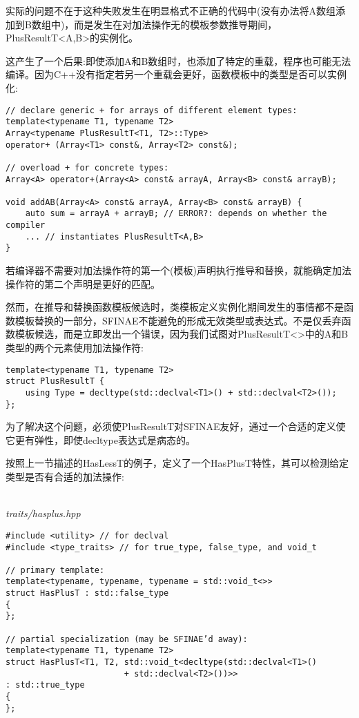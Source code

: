实际的问题不在于这种失败发生在明显格式不正确的代码中(没有办法将A数组添加到B数组中)，而是发生在对加法操作无的模板参数推导期间，PlusResultT<A,B>的实例化。

这产生了一个后果:即使添加A和B数组时，也添加了特定的重载，程序也可能无法编译。因为C++没有指定若另一个重载会更好，函数模板中的类型是否可以实例化:

\begin{lstlisting}[style=styleCXX]
// declare generic + for arrays of different element types:
template<typename T1, typename T2>
Array<typename PlusResultT<T1, T2>::Type>
operator+ (Array<T1> const&, Array<T2> const&);

// overload + for concrete types:
Array<A> operator+(Array<A> const& arrayA, Array<B> const& arrayB);

void addAB(Array<A> const& arrayA, Array<B> const& arrayB) {
	auto sum = arrayA + arrayB; // ERROR?: depends on whether the compiler
	... // instantiates PlusResultT<A,B>
}
\end{lstlisting}

若编译器不需要对加法操作符的第一个(模板)声明执行推导和替换，就能确定加法操作符的第二个声明是更好的匹配。

然而，在推导和替换函数模板候选时，类模板定义实例化期间发生的事情都不是函数模板替换的一部分，SFINAE不能避免的形成无效类型或表达式。不是仅丢弃函数模板候选，而是立即发出一个错误，因为我们试图对PlusResultT<>中的A和B类型的两个元素使用加法操作符:

\begin{lstlisting}[style=styleCXX]
template<typename T1, typename T2>
struct PlusResultT {
	using Type = decltype(std::declval<T1>() + std::declval<T2>());
};
\end{lstlisting}

为了解决这个问题，必须使PlusResultT对SFINAE友好，通过一个合适的定义使它更有弹性，即使decltype表达式是病态的。

按照上一节描述的HasLessT的例子，定义了一个HasPlusT特性，其可以检测给定类型是否有合适的加法操作:

\hspace*{\fill} \\ %
\noindent
\textit{traits/hasplus.hpp}
\begin{lstlisting}[style=styleCXX]
#include <utility> // for declval
#include <type_traits> // for true_type, false_type, and void_t

// primary template:
template<typename, typename, typename = std::void_t<>>
struct HasPlusT : std::false_type
{
};

// partial specialization (may be SFINAE’d away):
template<typename T1, typename T2>
struct HasPlusT<T1, T2, std::void_t<decltype(std::declval<T1>()
						+ std::declval<T2>())>>
: std::true_type
{
};
\end{lstlisting}

